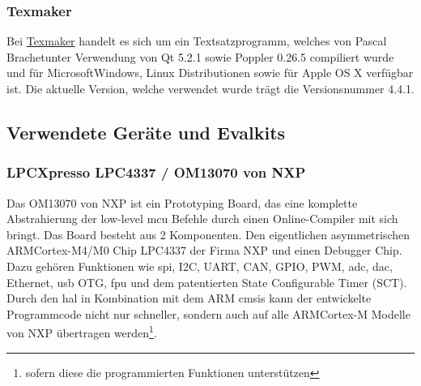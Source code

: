 \subsubsection*{Texmaker}
Bei \href{http://http://www.xm1math.net/texmaker/}{Texmaker} handelt es sich um ein Textsatzprogramm, welches von Pascal Brachet\SymbC unter Verwendung von Qt 5.2.1 sowie Poppler 0.26.5 compiliert wurde und für Microsoft\SymbC Windows\SymbReg, Linux Distributionen sowie für Apple OS X verfügbar ist. Die aktuelle Version, welche verwendet wurde trägt die Versionsnummer 4.4.1.

\subsection{Verwendete Geräte und Evalkits}
\subsubsection*{LPCXpresso LPC4337 / OM13070 von NXP}\label{subsec:lpc}
Das OM13070 von NXP ist ein Prototyping Board, das eine komplette Abstrahierung der low-level \ac{mcu} Befehle durch einen Online-Compiler mit sich bringt. Das Board besteht aus 2 Komponenten. Den eigentlichen asymmetrischen ARM\SymbReg Cortex\SymbReg-M4/M0 Chip LPC4337 der Firma NXP und einen Debugger Chip. Dazu gehören Funktionen wie \ac{spi}, I2C, UART, CAN, GPIO, PWM, \ac{adc}, \ac{dac}, Ethernet, \ac{usb} OTG, \ac{fpu} und dem patentierten State Configurable Timer (SCT).\\
Durch den \ac{hal} in Kombination mit dem ARM \ac{cmsis} kann der entwickelte Programmcode nicht nur schneller, sondern auch auf alle ARM\SymbReg Cortex\SymbReg-M Modelle von NXP übertragen werden\footnote{sofern diese die programmierten Funktionen unterstützen}.

